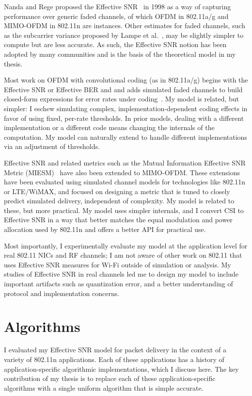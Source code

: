 Nanda and Rege proposed the Effective SNR~\cite{Nanda_EffectiveSNR} in 1998 as a way of capturing performance over generic faded channels, of which OFDM in 802.11a/g and MIMO-OFDM in 802.11n are instances. Other estimates for faded channels, such as the subcarrier variance proposed by Lampe et al.~\cite{Lampe_adaptation}, may be slightly simpler to compute but are less accurate. As such, the Effective SNR notion has been adopted by many communities and is the basis of the theoretical model in my thesis.

Most work on OFDM with convolutional coding (as in 802.11a/g) begins with the Effective SNR or Effective BER and and adds simulated faded channels to build closed-form expressions for error rates under coding~\cite{Awoniyi_ofdm,Nortel_3g,Tralli_convolutional}. My model is related, but simpler: I eschew simulating complex, implementation-dependent coding effects in favor of using fixed, per-rate thresholds. In prior models, dealing with a different implementation or a different code means changing the internals of the computation. My model can naturally extend to handle different implementations via an adjustment of thresholds.

Effective SNR and related metrics such as the Mutual Information Effective SNR Metric (MIESM)~\cite{He_MIESM,Liu_EESM,Kant_FLA,Jensen_FLA,Martorell_11n} have also been extended to MIMO-OFDM. These extensions have been evaluated using simulated channel models for technologies like 802.11n or LTE/WiMAX, and focused on designing a metric that is tuned to closely predict simulated delivery, independent of complexity. My model is related to these, but more practical. My model uses simpler internals, and I convert CSI to Effective SNR in a way that better matches the equal modulation and power allocation used by 802.11n and offers a better API for practical use.

Most importantly, I experimentally evaluate my model at the application level for real 802.11 NICs and RF channels; I am not aware of other work on 802.11 that uses Effective SNR measures for Wi-Fi outside of simulation or analysis. My studies of Effective SNR in real channels led me to design my model to include important artifacts such as quantization error, and a better understanding of protocol and implementation concerns.

\section{Algorithms}
I evaluated my Effective SNR model for packet delivery in the context of a variety of 802.11n applications. Each of these applications has a history of application-specific algorithmic implementations, which I discuss here. The key contribution of my thesis is to replace each of these application-specific algorithms with a single uniform algorithm that is simple accurate.

